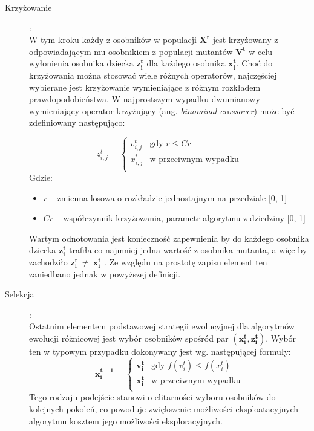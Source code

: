 \documentclass[12pt,a4paper]{report}
\begin{document}
{{{\begin{description}
	  \item[Krzyżowanie]:\\
  W tym kroku każdy z osobników w populacji $\mathbf{X^{t}}$ jest krzyżowany z odpowiadającym mu osobnikiem z populacji mutantów $\mathbf{V^{t}}$ w celu wyłonienia osobnika dziecka $\mathbf{z_i^{t}}$ dla każdego osobnika $\mathbf{x_i^{t}}$. Choć do krzyżowania można stosować wiele różnych operatorów, najczęściej wybierane jest krzyżowanie wymieniające z różnym rozkładem prawdopodobieństwa. W najprostszym wypadku dwumianowy wymieniający operator krzyżujący (ang. \emph{binominal crossover}) może być zdefiniowany następująco:
  
\begin{equation}
\label{eq:BasicCrossover}
z_{i,j}^{t} = \left\{ \begin{array}{ll}
v_{i,j}^{t} & \textrm{gdy $r \le Cr$}\\
x_{i,j}^{t} & \textrm{w przeciwnym wypadku}\\
\end{array} \right.
\end{equation}
Gdzie:
\begin{itemize}
\item $r$ -- zmienna losowa o rozkładzie jednostajnym na przedziale [0, 1]
\item $Cr$ -- współczynnik krzyżowania, parametr algorytmu z dziedziny [0, 1]
\end{itemize}
Wartym odnotowania jest konieczność zapewnienia by do każdego osobnika dziecka $\mathbf{z_i^{t}}$ trafiła co najmniej jedna wartość z osobnika mutanta, a więc by zachodziło $\mathbf{z_i^{t}}~\neq~\mathbf{x_i^{t}}$ \cite{SpringerIntroToEvol}. Ze względu na prostotę zapisu element ten zaniedbano jednak w powyższej definicji.


		\item[Selekcja]:\\
Ostatnim elementem podstawowej strategii ewolucyjnej dla algorytmów ewolucji różnicowej jest wybór osobników spośród par $(\mathbf{x_i^{t}}, \mathbf{z_i^{t}})$. Wybór ten w typowym przypadku dokonywany jest wg. następującej formuły:
$$
\mathbf{x_{i}^{t+1}} = \left\{ \begin{array}{ll}
\mathbf{v_{i}^{t}} & \textrm{gdy $f(v_i^t) \le f(x_i^t)$}\\
\mathbf{x_{i}^{t}} & \textrm{w przeciwnym wypadku}\\
\end{array} \right.
$$
Tego rodzaju podejście stanowi o elitarności wyboru osobników do kolejnych pokoleń, co powoduje zwiększenie możliwości eksploatacyjnych algorytmu kosztem jego możliwości eksploracyjnych.
\end{description}
}

}}
\end{document}
